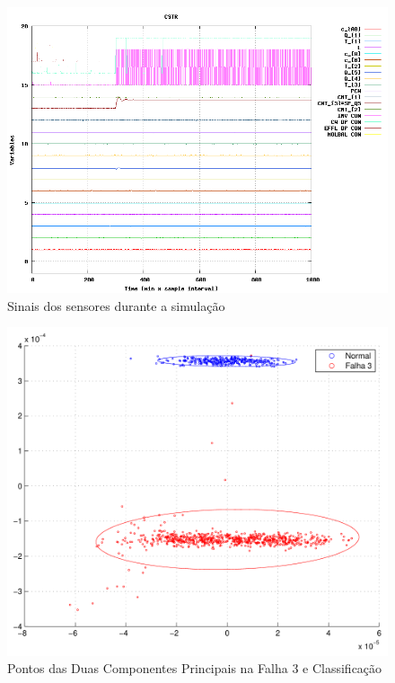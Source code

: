 \documentclass[journal]{IEEEtran}
\begin{document}
\begin{figure}[H]
	\centering
  	\includegraphics[scale=0.5]{figs/fault3/sinal_falha_3.png}
  	\caption{Sinais dos sensores durante a simulação}
	\label{fig:f3:s}
\end{figure}

\begin{figure}[H]
	\centering
  \includegraphics[scale=0.6]{figs/fault3/pontos2D.pdf}
  \caption{Pontos das Duas Componentes Principais na Falha 3 e Classificação}
	\label{fig:f3:2d}
\end{figure}
\end{document}
